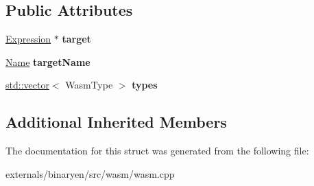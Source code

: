 \subsection*{Public Attributes}
\begin{DoxyCompactItemize}
\item 
\mbox{\label{structwasm_1_1_type_seeker_a4fb0ce022c24193b8062f8930dcafb13}} 
\mbox{\hyperlink{classwasm_1_1_expression}{Expression}} $\ast$ {\bfseries target}
\item 
\mbox{\label{structwasm_1_1_type_seeker_a72bffaf87340e793f97bb5d64b71d972}} 
\mbox{\hyperlink{structwasm_1_1_name}{Name}} {\bfseries target\+Name}
\item 
\mbox{\label{structwasm_1_1_type_seeker_a4f85af141e315bdc03a1b88fe2805c9a}} 
\mbox{\hyperlink{classstd_1_1vector}{std\+::vector}}$<$ Wasm\+Type $>$ {\bfseries types}
\end{DoxyCompactItemize}
\subsection*{Additional Inherited Members}


The documentation for this struct was generated from the following file\+:\begin{DoxyCompactItemize}
\item 
externals/binaryen/src/wasm/wasm.\+cpp\end{DoxyCompactItemize}
